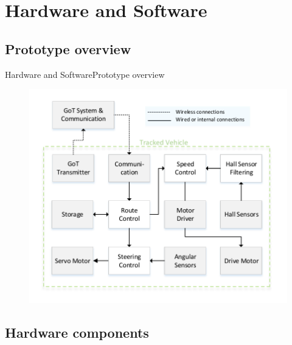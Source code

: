\section{Hardware and Software}
\subsection{Prototype overview}

\begin{frame}{Hardware and Software}{Prototype overview}
  \begin{figure}[H]
	\centering
	\includegraphics[scale=0.65]{Pictures/SO3.pdf}
  \end{figure}
\end{frame}

\subsection{Hardware components}

